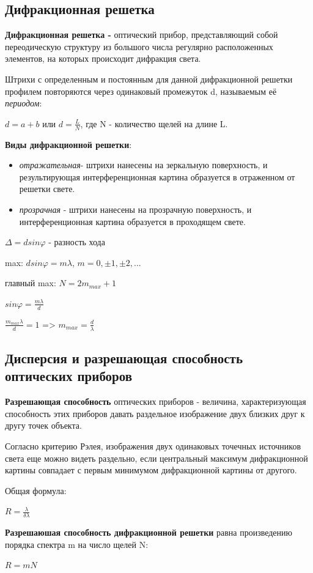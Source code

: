 \documentclass[12pt]{report}
\begin{document}
\subsection{Дифракционная решетка}
\textbf{Дифракционная решетка -} оптический прибор, представляющий собой переодическую структуру из большого числа регулярно расположенных элементов, на которых происходит дифракция света.\par
Штрихи с определенным и постоянным для данной дифракционной решетки профилем повторяются через одинаковый промежуток d, называемым её \textit{периодом}:\par
$d = a + b$ или $d = \frac{L}{N}$, где N - количество щелей на длине L.\par
\textbf{Виды дифракционной решетки}:\par
\begin{itemize}
    \item \textit{отражательная}- штрихи нанесены на зеркальную поверхность, и результирующая интерференционная картина образуется в отраженном от решетки свете.\par
    \item \textit{прозрачная} - штрихи нанесены на прозрачную поверхность, и интерференционная картина образуется в проходящем свете. \par
\end{itemize}
$\Delta = d sin \varphi$ - разность хода\par
max: $d sin \varphi = m \lambda$, $m = 0, \pm 1, \pm 2, ...$\par
главный max: $N = 2m_{max} + 1$\par
$sin \varphi = \frac{m \lambda}{d}$\par
$\frac{m_{max} \lambda}{d} = 1$ => $m_{max} = \frac{d}{\lambda}$\par


\subsection{Дисперсия и разрешающая способность оптических приборов}
\textbf{Разрешающая способность} оптических приборов - величина, характеризующая способность этих приборов давать раздельное изображение двух близких друг к другу точек объекта.\par
Согласно критерию Рэлея, изображения двух одинаковых точечных источников света еще можно видеть раздельно, если центральный максимум дифракционной картины совпадает с первым минимумом дифракционной картины от другого.\par
Общая формула:\par
$R = \frac{\lambda}{\delta \lambda}$\par
\textbf{Разрешаюшая способность дифракционной решетки} равна произведению порядка спектра m на число щелей N:\par
$R = mN$\par
\end{document}
